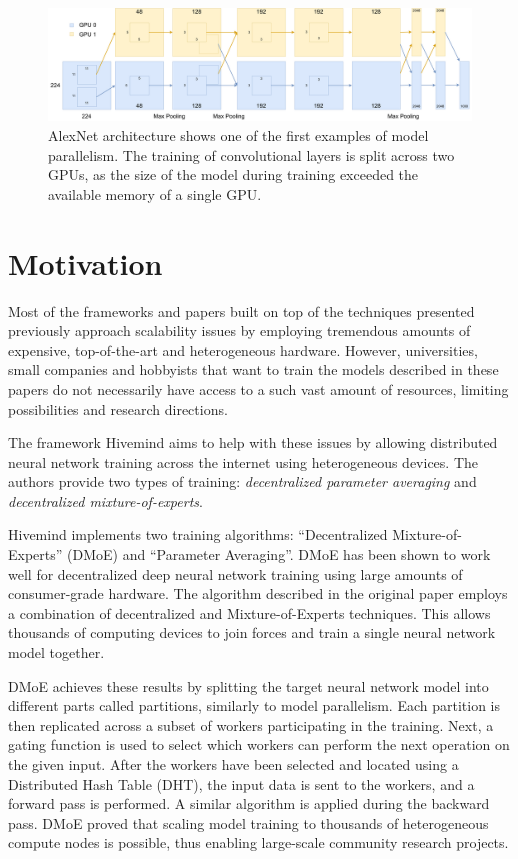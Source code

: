 \begin{figure}[h]
    \caption{AlexNet \cite{alexnet2012} architecture shows one of the first examples of model parallelism. The training of convolutional layers is split across two GPUs, as the size of the model during training exceeded the available memory of a single GPU.}
    \label{fig:alexnet}
    \includegraphics[width=\textwidth]{./figures/alexnet.pdf}
\end{figure}

\section{Motivation}

Most of the frameworks and papers built on top of the techniques presented previously approach scalability issues by employing tremendous amounts of expensive, top-of-the-art and heterogeneous hardware.
However, universities, small companies and hobbyists that want to train the models described in these papers do not necessarily have access to a such vast amount of resources, limiting possibilities and research directions.

The framework Hivemind \cite{riabinin2020hivemind} aims to help with these issues by allowing distributed neural network training across the internet using heterogeneous devices.
The authors provide two types of training: \textit{decentralized parameter averaging} and \textit{decentralized mixture-of-experts}.

Hivemind implements two training algorithms: ``Decentralized Mixture-of-Experts'' (DMoE) \cite{ryabinin2020learning} and ``Parameter Averaging''.
DMoE has been shown to work well for decentralized deep neural network training using large amounts of consumer-grade hardware.
The algorithm described in the original paper employs a combination of decentralized and Mixture-of-Experts \cite{shazeer2017outrageously} techniques.
This allows thousands of computing devices to join forces and train a single neural network model together.

DMoE achieves these results by splitting the target neural network model into different parts called partitions, similarly to model parallelism.
Each partition is then replicated across a subset of workers participating in the training.
Next, a gating function is used to select which workers can perform the next operation on the given input.
After the workers have been selected and located using a Distributed Hash Table (DHT), the input data is sent to the workers, and a forward pass is performed.
A similar algorithm is applied during the backward pass.
DMoE proved that scaling model training to thousands of heterogeneous compute nodes is possible, thus enabling large-scale community research projects.

